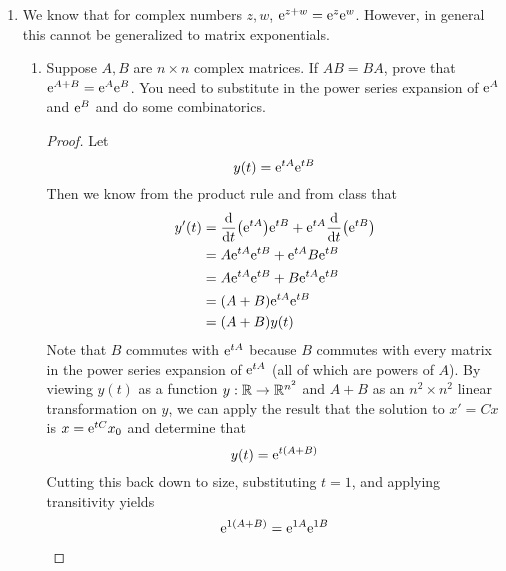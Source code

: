 \documentclass[../psets.tex]{subfiles}
\begin{document}
\begin{enumerate}
\begin{proof}
        To convert back to scalar land, recall that by the construction of the 2D system, $Y^1=x$. Therefore, we can read from the above that
        \begin{equation*}
            x(t) = x(0)\cos\omega t+x'(0)\frac{\sin\omega t}{\omega}+\int_0^t\frac{\sin\omega(t-\tau)}{\omega}f(\tau)\dd\tau
        \end{equation*}
        as desired.
    \end{proof}
    \item We know that for complex numbers $z,w$, $\e[z+w]=\e[z]\e[w]$. However, in general this cannot be generalized to matrix exponentials.
    \begin{enumerate}
        \item Suppose $A,B$ are $n\times n$ complex matrices. If $AB=BA$, prove that $\e[A+B]=\e[A]\e[B]$. You need to substitute in the power series expansion of $\e[A]$ and $\e[B]$ and do some combinatorics.
        \begin{proof}
            Let
            \begin{equation*}
                y(t) = \e[tA]\e[tB]
            \end{equation*}
            Then we know from the product rule and from class that
            \begin{align*}
                y'(t) &= \dv{t}(\e[tA])\e[tB]+\e[tA]\dv{t}(\e[tB])\\
                &= A\e[tA]\e[tB]+\e[tA]B\e[tB]\\
                &= A\e[tA]\e[tB]+B\e[tA]\e[tB]\\
                &= (A+B)\e[tA]\e[tB]\\
                &= (A+B)y(t)
            \end{align*}
            Note that $B$ commutes with $\e[tA]$ because $B$ commutes with every matrix in the power series expansion of $\e[tA]$ (all of which are powers of $A$). By viewing $y(t)$ as a function $y:\R\to\R^{n^2}$ and $A+B$ as an $n^2\times n^2$ linear transformation on $y$, we can apply the result that the solution to $x'=Cx$ is $x=\e[tC]x_0$ and determine that
            \begin{equation*}
                y(t) = \e[t(A+B)]
            \end{equation*}
            Cutting this back down to size, substituting $t=1$, and applying transitivity yields
            \begin{align*}
                \e[1(A+B)] &= \e[1A]\e[1B]\\

\end{align*}
\end{proof}
\end{enumerate}
\end{enumerate}
\end{document}

